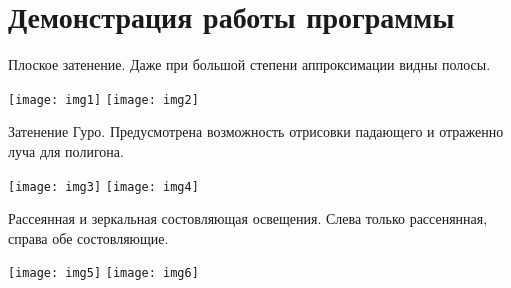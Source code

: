 \graphicspath{{png/}}

\section{Демонстрация работы программы}

Плоское затенение. Даже при большой степени аппроксимации видны полосы.

\texttt{[image: img1]}
\texttt{[image: img2]}

Затенение Гуро. Предусмотрена возможность отрисовки падающего и отраженно луча для полигона.

\texttt{[image: img3]}
\texttt{[image: img4]}
\pagebreak

Рассеянная и зеркальная состовляющая освещения. Слева только рассенянная, справа обе состовляющие.

\texttt{[image: img5]}
\texttt{[image: img6]}
\pagebreak
